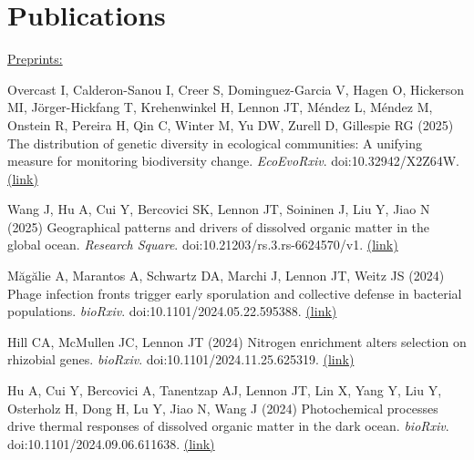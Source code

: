 \documentclass[11pt]{article}
\begin{document}
\section*{Publications}
\vspace{-0.25em} %
\begin{etaremune}

\item[] \textnormal{\underline{Preprints:}}


\item Overcast I, Calderon-Sanou I, Creer S, Dominguez-Garcia V, Hagen O, Hickerson MI, Jörger-Hickfang T, Krehenwinkel H, Lennon JT, Méndez L, Méndez M, Onstein R, Pereira H, Qin C, Winter M, Yu DW, Zurell D, Gillespie RG (2025) The distribution of genetic diversity in ecological communities: A unifying measure for monitoring biodiversity change. \textit{EcoEvoRxiv}. doi:10.32942/X2Z64W. \href{https://ecoevorxiv.org/repository/view/9169/}{(link)}

\item Wang J, Hu A, Cui Y, Bercovici SK, Lennon JT, Soininen J, Liu Y, Jiao N (2025) Geographical patterns and drivers of dissolved organic matter in the global ocean. \textit{Research Square}. doi:10.21203/rs.3.rs-6624570/v1. \href{https://assets-eu.researchsquare.com/files/rs-6624570/v1/a75822e6-0649-4c95-919e-3ba016f0bc96.pdf?c=1747022553}{(link)}

\item Măgălie A, Marantos A, Schwartz DA, Marchi J, Lennon JT, Weitz JS (2024) Phage infection fronts trigger early sporulation and collective defense in bacterial populations. \textit{bioRxiv}. doi:10.1101/2024.05.22.595388. \href{https://www.biorxiv.org/content/10.1101/2024.05.22.595388v1.full.pdf}{(link)}

\item Hill CA, McMullen JC, Lennon JT (2024) Nitrogen enrichment alters selection on rhizobial genes. \textit{bioRxiv}. doi:10.1101/2024.11.25.625319. \href{https://www.biorxiv.org/content/10.1101/2024.11.25.625319v1.full.pdf}{(link)}

\item Hu A, Cui Y, Bercovici A, Tanentzap AJ, Lennon JT, Lin X, Yang Y, Liu Y, Osterholz H, Dong H, Lu Y, Jiao N, Wang J (2024) Photochemical processes drive thermal responses of dissolved organic matter in the dark ocean. \textit{bioRxiv}. doi:10.1101/2024.09.06.611638. \href{https://www.biorxiv.org/content/10.1101/2024.09.06.611638v1.full.pdf}{(link)}


\end{etaremune}
\end{document}
